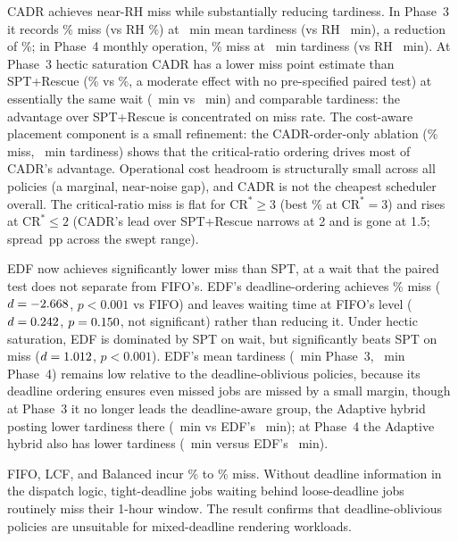 {CADR achieves near-RH miss while substantially reducing tardiness. In Phase~3 it records \CADRmiss\% miss (vs RH \RHMiss\%) at \CADRtard~min mean tardiness (vs RH \RHtard~min), a reduction of \CADRtardReduction\%; in Phase~4 monthly operation, \PhFourCADRMiss\% miss at \PhFourCADRTard~min tardiness (vs RH \PhFourRHtard~min). At Phase~3 hectic saturation CADR has a lower miss point estimate than SPT+Rescue (\CADRmiss\% vs \RescueMiss\%, a moderate effect with no pre-specified paired test) at essentially the same wait (\CADRwait~min vs \RescueWait~min) and comparable tardiness: the advantage over SPT+Rescue is concentrated on miss rate. The cost-aware placement component is a small refinement: the CADR-order-only ablation (\CADROOmiss\% miss, \CADROOtard~min tardiness) shows that the critical-ratio ordering drives most of CADR's advantage. Operational cost headroom is structurally small across all policies (a marginal, near-noise gap), and CADR is not the cheapest scheduler overall. The critical-ratio miss is flat for $\mathrm{CR}^*\geq 3$ (best \CRStarBestMiss\% at $\mathrm{CR}^*=3$) and rises at $\mathrm{CR}^*\leq 2$ (CADR's lead over SPT+Rescue narrows at 2 and is gone at 1.5; spread \CRStarMissSpread\,pp across the swept range).

EDF now achieves significantly lower miss than SPT, at a wait that the paired test does not separate from FIFO's. EDF's deadline-ordering achieves \EDFmiss\% miss ($d=-2.668$, $p<0.001$ vs FIFO) and leaves waiting time at FIFO's level ($d=0.242$, $p=0.150$, not significant) rather than reducing it. Under hectic saturation, EDF is dominated by SPT on wait, but significantly beats SPT on miss ($d=1.012$, $p<0.001$). EDF's mean tardiness (\EDFtard~min Phase~3, \PhFourEDFtard~min Phase~4) remains low relative to the deadline-oblivious policies, because its deadline ordering ensures even missed jobs are missed by a small margin, though at Phase~3 it no longer leads the deadline-aware group, the Adaptive hybrid posting lower tardiness there (\AdaptiveTard~min vs EDF's \EDFtard~min); at Phase~4 the Adaptive hybrid also has lower tardiness (\PhFourAdaptiveTard~min versus EDF's \PhFourEDFtard~min).

FIFO, LCF, and Balanced incur \FIFOmiss\% to \Balancedmiss\% miss. Without deadline information in the dispatch logic, tight-deadline jobs waiting behind loose-deadline jobs routinely miss their 1-hour window. The result confirms that deadline-oblivious policies are unsuitable for mixed-deadline rendering workloads.

}
